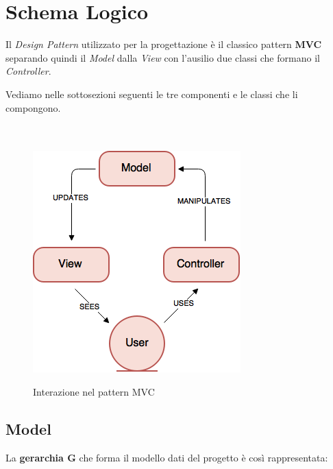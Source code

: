 \documentclass[10pt,a4paper,openany]{article}
\begin{document}
\section{Schema Logico}	

Il \textit{Design Pattern} utilizzato per la progettazione è il classico pattern \textbf{MVC} separando quindi il \textit{Model} dalla \textit{View} con l'ausilio due classi che formano il \textit{Controller}.

Vediamo nelle sottosezioni seguenti le tre componenti e le classi che li compongono.\\\\\\


\begin{figure}[!h]
\centering
\includegraphics[angle=0,scale=.45]{MVC.png}\\
\caption{Interazione nel pattern MVC}
\label{fig:MVC}
\end{figure}


\newpage

	\subsection{Model}
	
	La \textbf{gerarchia G} che forma il modello dati del progetto è così rappresentata:\\\\\\
	
\end{document}
